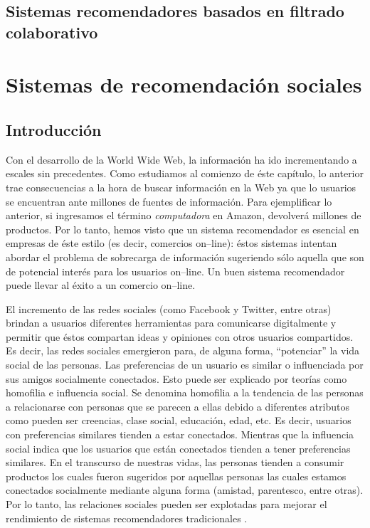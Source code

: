 	\subsection{Sistemas recomendadores basados en filtrado colaborativo}
	
\section{Sistemas de recomendación sociales}
	\subsection{Introducción}
		Con el desarrollo de la World Wide Web, la información ha ido incrementando a escales sin precedentes. Como estudiamos al comienzo de éste capítulo, lo anterior trae consecuencias a la hora de buscar información en la Web ya que lo usuarios se encuentran ante millones de fuentes de información. Para ejemplificar lo anterior, si ingresamos el término \textit{computadora} en Amazon, devolverá millones de productos. Por lo tanto, hemos visto que un sistema recomendador es esencial en empresas de éste estilo (es decir, comercios on--line): éstos sistemas intentan abordar el problema de sobrecarga de información sugeriendo sólo aquella que son de potencial interés para los usuarios on--line. Un buen sistema recomendador puede llevar al éxito a un comercio on--line. \par
		
		El incremento de las redes sociales (como Facebook y Twitter, entre otras) brindan a usuarios diferentes herramientas para comunicarse digitalmente y permitir que éstos compartan ideas y opiniones con otros usuarios compartidos. Es decir, las redes sociales emergieron para, de alguna forma, \enquote{potenciar} la vida social de las personas. Las preferencias de un usuario es similar o influenciada por sus amigos socialmente conectados. Esto puede ser explicado por teorías como homofilia e influencia social. Se denomina homofilia a la tendencia de las personas a relacionarse con personas que se parecen a ellas debido a diferentes atributos como pueden ser creencias, clase social, educación, edad, etc. Es decir, usuarios con preferencias similares tienden a estar conectados. Mientras que la influencia social indica que los usuarios que están conectados tienden a tener preferencias similares. En el transcurso de nuestras vidas, las personas tienden a consumir productos los cuales fueron sugeridos por aquellas personas las cuales estamos conectados socialmente mediante alguna forma (amistad, parentesco, entre otras). Por lo tanto, las relaciones sociales pueden ser explotadas para mejorar el rendimiento de sistemas recomendadores tradicionales \cite{tang2013}.
		
